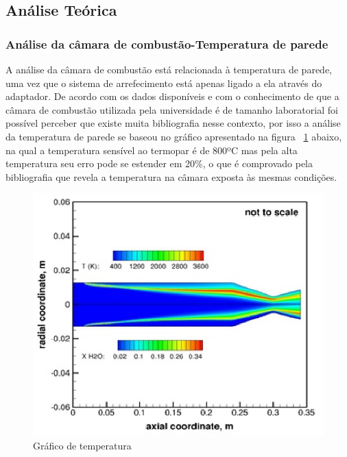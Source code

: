 \subsection{Análise Teórica}
\subsubsection{Análise da câmara de combustão-Temperatura de parede}
A análise da câmara de combustão está relacionada à temperatura de parede, uma vez que o sistema de arrefecimento está apenas ligado a ela através do adaptador. De acordo com os dados disponíveis e com o conhecimento de que a câmara de combustão utilizada pela universidade é de tamanho laboratorial foi possível perceber que existe muita bibliografia nesse contexto, por isso a análise da temperatura de parede se baseou no gráfico apresentado na figura ~\ref{fig1tc} abaixo, na qual a temperatura sensível ao termopar é de 800ºC mas pela alta temperatura seu erro pode se estender em 20\%, o que é comprovado pela bibliografia que revela a temperatura na câmara exposta às mesmas condições.
\begin{figure}[!htb]                  
	\centering                          
	\includegraphics[scale=1]{figuras/Figura1tc.eps}
	\caption{Gráfico de temperatura}\label{fig1tc}               
\end{figure}
\newpage
